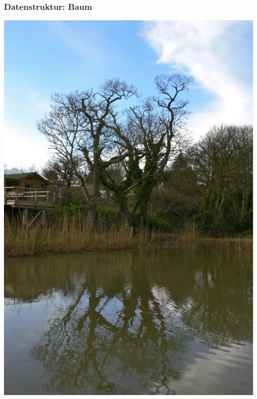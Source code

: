     \begin{frame}
      \frametitle{Datenstruktur: Baum}

      \begin{center}
        \begin{Huge}
          \includegraphics[height=.8\textheight]{img+txt/jersey_zoo_baum.jpg}
          \quad
          \par
        \end{Huge}
      \end{center}

    \end{frame}

